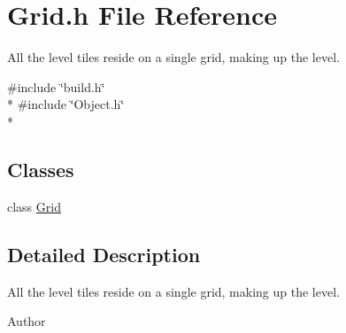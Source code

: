 \section{Grid.\-h File Reference}
\label{_grid_8h}


All the level tiles reside on a single grid, making up the level.  


{\ttfamily \#include \char`\"{}build.\-h\char`\"{}}\\*
{\ttfamily \#include \char`\"{}Object.\-h\char`\"{}}\\*
\subsection*{Classes}
\begin{DoxyCompactItemize}
\item 
class \hyperlink{class_grid}{Grid}
\end{DoxyCompactItemize}


\subsection{Detailed Description}
All the level tiles reside on a single grid, making up the level. \begin{DoxyAuthor}{Author}

\end{DoxyAuthor}
